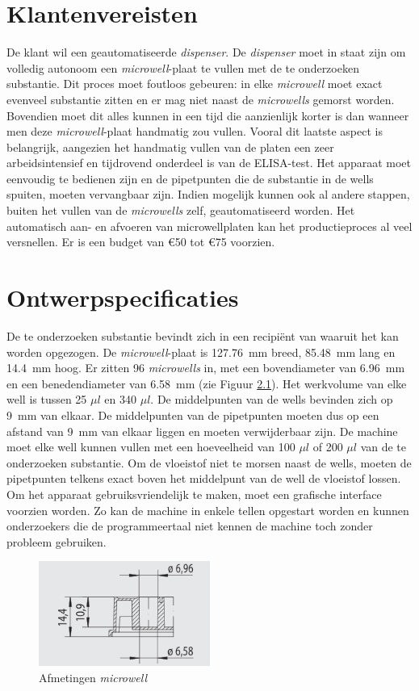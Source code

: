 \documentclass[a4paper,twoside,kulak]{kulakreport} %
\begin{document}
\chapter{Klantenvereisten}
De klant wil een geautomatiseerde \textit{dispenser}. De \textit{dispenser} moet in staat zijn om volledig autonoom een \textit{microwell}-plaat te vullen met de te onderzoeken substantie. Dit proces moet foutloos gebeuren: in elke \textit{microwell} moet exact evenveel substantie zitten en er mag niet naast de \textit{microwells} gemorst worden. Bovendien moet dit alles kunnen in een tijd die aanzienlijk korter is dan wanneer men deze \textit{microwell}-plaat handmatig zou vullen. Vooral dit laatste aspect is belangrijk, aangezien het handmatig vullen van de platen een zeer arbeidsintensief en tijdrovend onderdeel is van de ELISA-test. Het apparaat moet eenvoudig te bedienen zijn en de pipetpunten die de substantie in de wells spuiten, moeten vervangbaar zijn.  Indien mogelijk kunnen ook al andere stappen, buiten het vullen van de \textit{microwells} zelf, geautomatiseerd worden. Het automatisch aan- en afvoeren van microwellplaten kan het productieproces al veel versnellen. Er is een budget van \euro 50 tot \euro 75 voorzien.
\chapter{Ontwerpspecificaties}
De te onderzoeken substantie bevindt zich in een recipiënt van waaruit het kan worden opgezogen. De \textit{microwell}-plaat is \SI{127.76}{mm} breed, \SI{85.48}{mm} lang en \SI{14.4}{mm} hoog. Er zitten 96 \textit{microwells} in, met een bovendiameter van \SI{6.96}{mm} en een benedendiameter van \SI{6.58}{mm} (zie Figuur \ref{fig: afmetingenMicrowellplaat}). Het werkvolume van elke well is tussen 25 $\mu l$ en 340 $\mu l$. De middelpunten van de wells bevinden zich op \SI{9}{mm} van elkaar. De middelpunten van de pipetpunten moeten dus op een afstand van \SI{9}{mm} van elkaar liggen en moeten verwijderbaar zijn. De machine moet elke well kunnen vullen met een hoeveelheid van 100 $\mu l$ of 200 $\mu l$ van de te onderzoeken substantie. Om de vloeistof niet te morsen naast de wells, moeten de pipetpunten telkens exact boven het middelpunt van de well de vloeistof lossen. Om het apparaat gebruiksvriendelijk te maken, moet een grafische interface voorzien worden. Zo kan de machine in enkele tellen opgestart worden en kunnen onderzoekers die de programmeertaal niet kennen de machine toch zonder probleem gebruiken.

\begin{figure}[h]
	\centering
	\includegraphics[width=0.5\textwidth]{AfmetingenMicrowell.png}
	\caption{Afmetingen \textit{microwell}}
	\label{fig: afmetingenMicrowellplaat}
	
\end{figure} 
\end{document}
